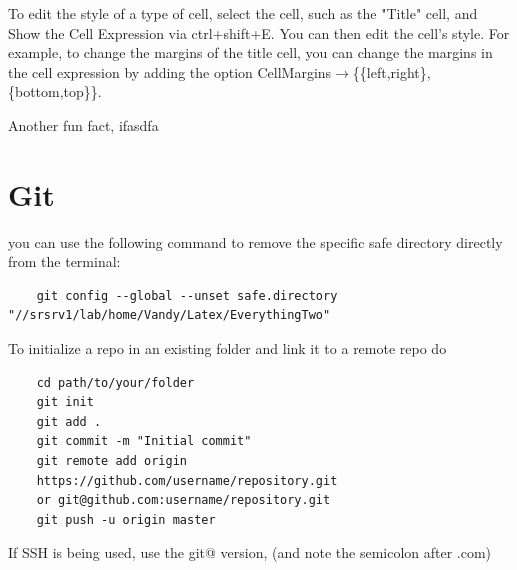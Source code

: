 \documentclass[../../main.tex]{subfiles} %
\begin{document}
To edit the style of a type of cell, select the cell, such as the "Title" cell, and Show the Cell Expression via ctrl+shift+E. You can then edit the cell's style. For example, to change the margins of the title cell, you can change the margins in the cell expression by adding the option CellMargins$\rightarrow$\{\{left,right\},\{bottom,top\}\}.

Another fun fact, ifasdfa 

\section{Git}
you can use the following command to remove the specific safe directory directly from the terminal: 
\begin{verbatim}
    git config --global --unset safe.directory "//srsrv1/lab/home/Vandy/Latex/EverythingTwo"
\end{verbatim}
To initialize a repo in an existing folder and link it to a remote repo do
\begin{verbatim}
    cd path/to/your/folder
    git init
    git add .
    git commit -m "Initial commit"
    git remote add origin 
    https://github.com/username/repository.git 
    or git@github.com:username/repository.git
    git push -u origin master
\end{verbatim}
If SSH is being used, use the git@ version, (and note the semicolon after .com)
\end{document}
